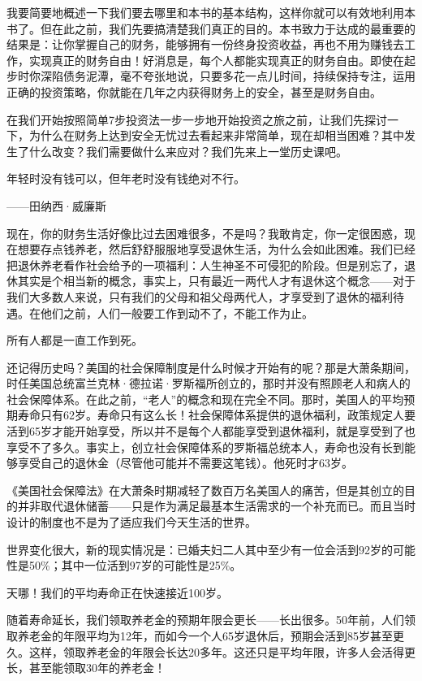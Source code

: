 我要简要地概述一下我们要去哪里和本书的基本结构，这样你就可以有效地利用本书了。但在此之前，我们先要搞清楚我们真正的目的。本书致力于达成的最重要的结果是：让你掌握自己的财务，能够拥有一份终身投资收益，再也不用为赚钱去工作，实现真正的财务自由！好消息是，每个人都能实现真正的财务自由。即使在起步时你深陷债务泥潭，毫不夸张地说，只要多花一点儿时间，持续保持专注，运用正确的投资策略，你就能在几年之内获得财务上的安全，甚至是财务自由。

在我们开始按照简单7步投资法一步一步地开始投资之旅之前，让我们先探讨一下，为什么在财务上达到安全无忧过去看起来非常简单，现在却相当困难？其中发生了什么改变？我们需要做什么来应对？我们先来上一堂历史课吧。

\begin{BookQuote}
年轻时没有钱可以，但年老时没有钱绝对不行。

\hfill ——田纳西·威廉斯
\end{BookQuote}

现在，你的财务生活好像比过去困难很多，不是吗？我敢肯定，你一定很困惑，现在想要存点钱养老，然后舒舒服服地享受退休生活，为什么会如此困难。我们已经把退休养老看作社会给予的一项福利：人生神圣不可侵犯的阶段。但是别忘了，退休其实是个相当新的概念，事实上，只有最近一两代人才有退休这个概念——对于我们大多数人来说，只有我们的父母和祖父母两代人，才享受到了退休的福利待遇。在他们之前，人们一般要工作到动不了，不能工作为止。

所有人都是一直工作到死。

还记得历史吗？美国的社会保障制度是什么时候才开始有的呢？那是大萧条期间，时任美国总统富兰克林·德拉诺·罗斯福所创立的，那时并没有照顾老人和病人的社会保障体系。在此之前，“老人”的概念和现在完全不同。那时，美国人的平均预期寿命只有62岁。寿命只有这么长！社会保障体系提供的退休福利，政策规定人要活到65岁才能开始享受，所以并不是每个人都能享受到退休福利，就是享受到了也享受不了多久。事实上，创立社会保障体系的罗斯福总统本人，寿命也没有长到能够享受自己的退休金（尽管他可能并不需要这笔钱）。他死时才63岁。

《美国社会保障法》在大萧条时期减轻了数百万名美国人的痛苦，但是其创立的目的并非取代退休储蓄——只是作为满足最基本生活需求的一个补充而已。而且当时设计的制度也不是为了适应我们今天生活的世界。

世界变化很大，新的现实情况是：已婚夫妇二人其中至少有一位会活到92岁的可能性是50\%；其中一位活到97岁的可能性是25\%。

天哪！我们的平均寿命正在快速接近100岁。

随着寿命延长，我们领取养老金的预期年限会更长——长出很多。50年前，人们领取养老金的年限平均为12年，而如今一个人65岁退休后，预期会活到85岁甚至更久。这样，领取养老金的年限会长达20多年。这还只是平均年限，许多人会活得更长，甚至能领取30年的养老金！


